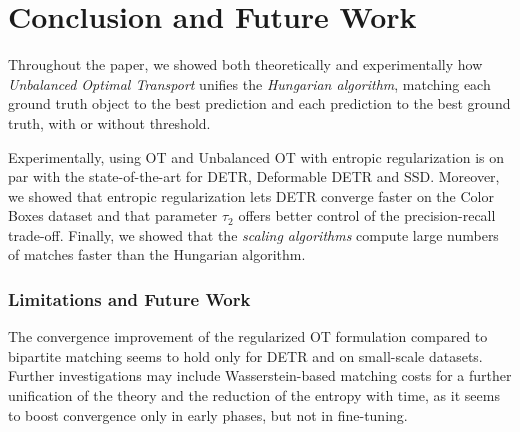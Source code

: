 \section{Conclusion and Future Work}

Throughout the paper, we showed both theoretically and experimentally how \emph{Unbalanced Optimal Transport} unifies the \emph{Hungarian algorithm}, matching each ground truth object to the best prediction and each prediction to the best ground truth, with or without threshold. 

Experimentally, using OT and Unbalanced OT with entropic regularization is on par with the state-of-the-art for DETR, Deformable DETR and SSD. Moreover, we showed that entropic regularization lets DETR converge faster on the Color Boxes dataset and that parameter $\tau_2$ offers better control of the precision-recall trade-off. Finally, we showed that the \emph{scaling algorithms} compute large numbers of matches faster than the Hungarian algorithm.

\subsubsection{Limitations and Future Work} The convergence improvement of the regularized OT formulation compared to bipartite matching seems to hold only for DETR and on small-scale datasets. Further investigations may include Wasserstein-based matching costs for a further unification of the theory and the reduction of the entropy with time, as it seems to boost convergence only in early phases, but not in fine-tuning.